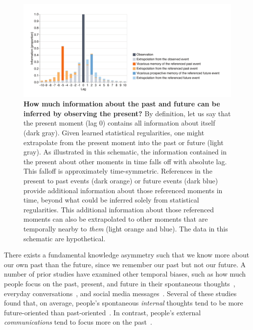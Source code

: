 \documentclass[10pt]{article}
\begin{document}
\begin{figure}[tp]
  \centering
  \includegraphics[width=\textwidth]{discussion}

  \caption{\textbf{How much information about the past and future can be inferred by observing the present?} By definition, let us say that the present moment (lag 0) contains all information about itself (dark gray). Given learned statistical regularities, one might extrapolate from the present moment into the past or future (light gray). As illustrated in this schematic, the information contained in the present about other moments in time falls off with absolute lag. This falloff is approximately time-symmetric. References in the present to past events (dark orange) or future events (dark blue) provide additional information about those referenced moments in time, beyond what could be inferred solely from statistical regularities. This additional information about those referenced moments can also be extrapolated to other moments that are temporally nearby to \textit{them} (light orange and blue). The data in this schematic are hypothetical.}

  \label{fig:discussion}
\end{figure}

There exists a fundamental knowledge asymmetry such that we know more about our own past than the future, since we remember our past but not our future.  A number of prior studies have examined other temporal biases, such as how much people focus on the past, present, and future in their spontaneous thoughts~\citep{GranWals16, SongWang12, ShipAeon19}, everyday conversations~\citep{DemiEtal18}, and social media messages~\citep{ParkEtal17}.  Several of these studies found that, on average, people's spontaneous \textit{internal} thoughts tend to be more future-oriented than past-oriented~\citep{GranWals16, SongWang12}.  In contrast, people's external \textit{communications} tend to focus more on the past~\citep{ParkEtal17, DemiEtal18}.  
\end{document}
